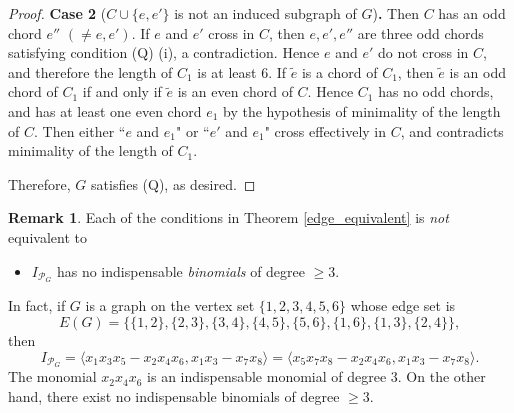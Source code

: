 \documentclass[12pt]{amsart}
\theoremstyle{definition}
\newtheorem{Remark}[thm]{Remark}
\numberwithin{thm}{section}
\numberwithin{equation}{section}
\def\epoly{{\mathcal P}_G}
\begin{document}
\begin{proof}
\noindent
{\bf Case 2} ($C \cup \{e,e'\}$ is not an induced subgraph of $G$){\bf .}    
    Then $C$ has an odd chord $e''$ $(\ne e, e')$.  
    If $e$ and $e'$ cross in $C$, then $e,e',e''$ are three odd chords satisfying condition (Q) (i), a contradiction. Hence $e$ and $e'$ do not cross in $C$, and therefore
    the length of $C_1$ is at least $6$.
    If $\widetilde{e}$ is a chord of $C_1$, then $\widetilde{e}$ is an odd chord of $C_1$ if and only if $\widetilde{e}$ is an even chord of $C$.
    Hence $C_1$ has no odd chords, and has at least one even chord $e_1$
    by the hypothesis of minimality of the length of $C$.
    Then either ``$e$ and $e_1$" or ``$e'$ and $e_1$" cross effectively in $C$,
    and contradicts minimality of the length of $C_1$.

\bigskip

    Therefore, $G$ satisfies (Q), as desired.
\end{proof}

\begin{Remark} \label{not equiv}
    Each of the conditions in Theorem \ref{edge_equivalent} is \emph{not} equivalent to
    \begin{itemize}
        \item[(v)]
                $I_{\epoly}$ has no indispensable {\it binomials} of degree $\ge 3$.
    \end{itemize}
    In fact, if $G$ is a graph on the vertex set $\{1,2,3,4,5,6\}$ whose edge set is
    $$E(G)= \{ \{1,2\},\{ 2, 3\}, \{ 3,4\}, \{ 4, 5\}, \{ 5, 6\},\{ 1,6 \}, \{ 1, 3\}, \{ 2,4 \}   \},$$
    then
    \[
    I_{\epoly} = 
    \langle x_1x_3x_5- x_2x_4x_6, x_1 x_3 -x_7 x_8\rangle
    =\langle x_5x_7x_8- x_2x_4x_6, x_1 x_3 -x_7 x_8\rangle  
    .\]
    The monomial $x_2x_4x_6$ is an indispensable monomial of degree $3$.
    On the other hand, there exist no indispensable binomials of degree $\ge 3$.
\end{Remark}
    
\end{document}
